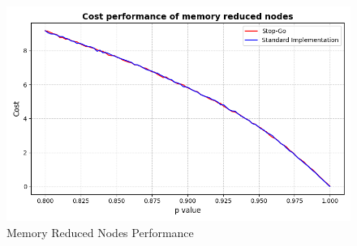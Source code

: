 \begin{figure}[htbp]
  \centering
  \includegraphics[width=\textwidth]{figs/Thomas/Return To Safety/Reduced Nodes.png}
  \caption{Memory Reduced Nodes Performance}
  \label{fig:Reduced Nodes}
\end{figure}